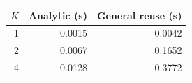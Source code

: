 \begin{tabular}{rrr}
\toprule
$K$ & Analytic (s) & General reuse (s)\\
\midrule
1 & 0.0015 & 0.0042\\
2 & 0.0067 & 0.1652\\
4 & 0.0128 & 0.3772\\
\bottomrule
\end{tabular}
